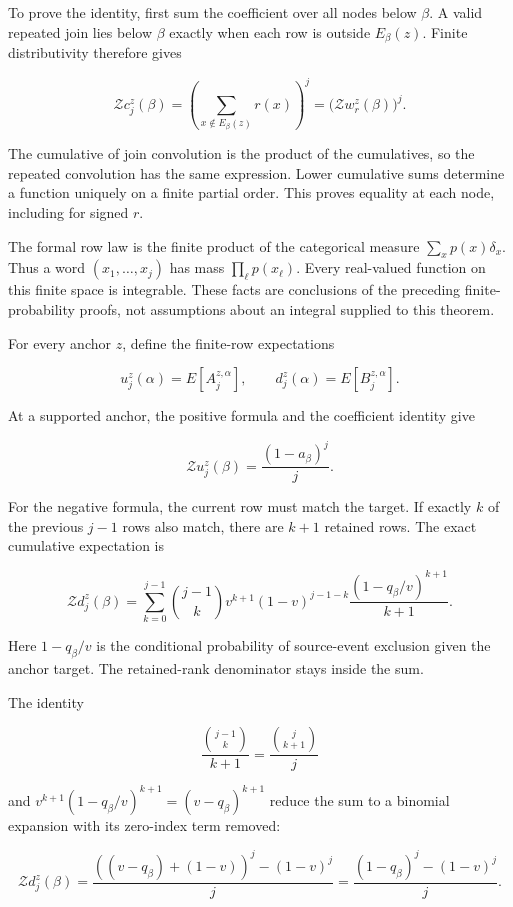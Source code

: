 To prove the identity, first sum the coefficient over all nodes below \(\beta\). A valid repeated join lies below \(\beta\) exactly when each row is outside \(E_\beta(z)\). Finite distributivity therefore gives

\[
\mathcal Zc_j^z(\beta)
=\left(\sum_{x\notin E_\beta(z)}r(x)\right)^j
=\bigl(\mathcal Zw_r^z(\beta)\bigr)^j.
\]

The cumulative of join convolution is the product of the cumulatives, so the repeated convolution has the same expression. Lower cumulative sums determine a function uniquely on a finite partial order. This proves equality at each node, including for signed \(r\).

\label{expectations-under-the-actual-row-law}

The formal row law is the finite product of the categorical measure \(\sum_xp(x)\delta_x\). Thus a word \((x_1,\ldots,x_j)\) has mass \(\prod_\ell p(x_\ell)\). Every real-valued function on this finite space is integrable. These facts are conclusions of the preceding finite-probability proofs, not assumptions about an integral supplied to this theorem.

For every anchor \(z\), define the finite-row expectations

\[
u_j^z(\alpha)=E[A_j^{z,\alpha}],\qquad
d_j^z(\alpha)=E[B_j^{z,\alpha}].
\]

At a supported anchor, the positive formula and the coefficient identity give

\[
\mathcal Zu_j^z(\beta)=\frac{(1-a_\beta)^j}{j}.
\]

For the negative formula, the current row must match the target. If exactly \(k\) of the previous \(j-1\) rows also match, there are \(k+1\) retained rows. The exact cumulative expectation is

\[
\mathcal Zd_j^z(\beta)=
\sum_{k=0}^{j-1}\binom{j-1}{k}
v^{k+1}(1-v)^{j-1-k}
\frac{(1-q_\beta/v)^{k+1}}{k+1}.
\]

Here \(1-q_\beta/v\) is the conditional probability of source-event exclusion given the anchor target. The retained-rank denominator stays inside the sum.

The identity

\[
\frac{\binom{j-1}{k}}{k+1}=\frac{\binom{j}{k+1}}{j}
\]

and \(v^{k+1}(1-q_\beta/v)^{k+1}=(v-q_\beta)^{k+1}\) reduce the sum to a binomial expansion with its zero-index term removed:

\[
\mathcal Zd_j^z(\beta)
=\frac{((v-q_\beta)+(1-v))^j-(1-v)^j}{j}
=\frac{(1-q_\beta)^j-(1-v)^j}{j}.
\]

